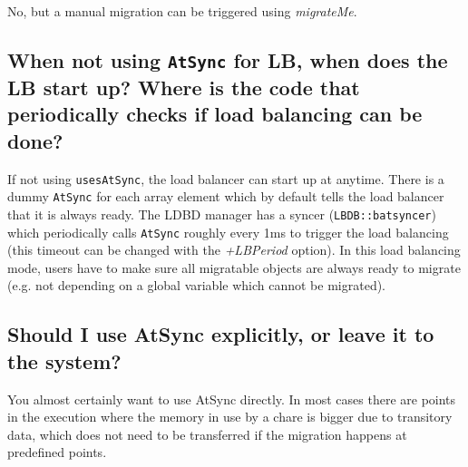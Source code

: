 No, but a manual migration can be triggered using {\em migrateMe}.


\subsection{When not using {\tt AtSync} for LB, when does the LB start
up? Where is the code that periodically checks if load balancing can be
done?}

If not using {\tt usesAtSync}, the load balancer can start up at
anytime. There is a dummy {\tt AtSync} for each array element which
by default tells the load balancer that it is always ready. The LDBD manager
has a syncer ({\tt LBDB::batsyncer}) which periodically calls {\tt AtSync}
roughly every 1ms to trigger the load balancing (this timeout can be changed
with the {\em +LBPeriod} option). In this load balancing
mode, users have to make sure all migratable objects are always ready to
migrate (e.g. not depending on a global variable which cannot be migrated).

\subsection{Should I use AtSync explicitly, or leave it to the system?}

You almost certainly want to use AtSync directly. In most cases there are
points in the execution where the memory in use by a chare is bigger due to
transitory data, which does not need to be transferred if the migration happens
at predefined points.


